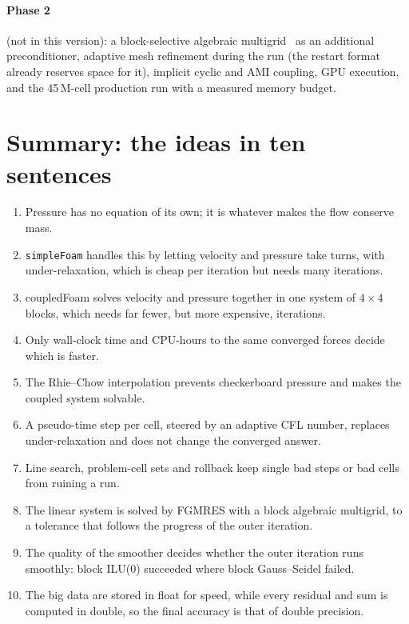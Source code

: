 \documentclass[11pt,a4paper]{article}
\newcommand{\code}[1]{\texttt{#1}}
\begin{document}
\paragraph{Phase 2} (not in this version): a block-selective algebraic
multigrid~\cite{Uroic2018,Uroic2021} as an additional preconditioner,
adaptive mesh refinement during the run (the restart format already
reserves space for it), implicit cyclic and AMI coupling, GPU execution,
and the 45\,M-cell production run with a measured memory budget.

\section{Summary: the ideas in ten sentences}\label{sec:summary}

\begin{enumerate}
\item Pressure has no equation of its own; it is whatever makes the flow
  conserve mass.
\item \code{simpleFoam} handles this by letting velocity and pressure take
  turns, with under-relaxation, which is cheap per iteration but needs many
  iterations.
\item coupledFoam solves velocity and pressure together in one system of
  $4\times4$ blocks, which needs far fewer, but more expensive, iterations.
\item Only wall-clock time and CPU-hours to the same converged forces decide
  which is faster.
\item The Rhie--Chow interpolation prevents checkerboard pressure and makes
  the coupled system solvable.
\item A pseudo-time step per cell, steered by an adaptive CFL number,
  replaces under-relaxation and does not change the converged answer.
\item Line search, problem-cell sets and rollback keep single bad steps or
  bad cells from ruining a run.
\item The linear system is solved by FGMRES with a block algebraic
  multigrid, to a tolerance that follows the progress of the outer
  iteration.
\item The quality of the smoother decides whether the outer iteration runs
  smoothly: block ILU(0) succeeded where block Gauss--Seidel failed.
\item The big data are stored in float for speed, while every residual and
  sum is computed in double, so the final accuracy is that of double
  precision.
\end{enumerate}
\end{document}
